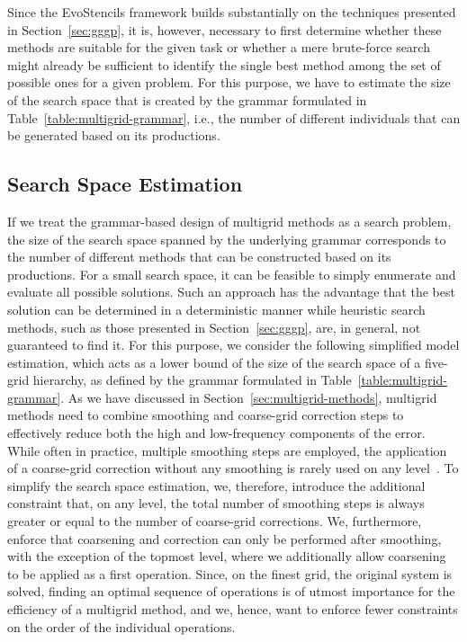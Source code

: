 Since the EvoStencils framework builds substantially on the techniques presented in Section~\ref{sec:gggp}, it is, however, necessary to first determine whether these methods are suitable for the given task or whether a mere brute-force search might already be sufficient to identify the single best method among the set of possible ones for a given problem.
For this purpose, we have to estimate the size of the search space that is created by the grammar formulated in Table~\ref{table:multigrid-grammar}, i.e., the number of different individuals that can be generated based on its productions.

\subsection{Search Space Estimation}
\label{sec:search-space-estimation}
If we treat the grammar-based design of multigrid methods as a search problem, the size of the search space spanned by the underlying grammar corresponds to the number of different methods that can be constructed based on its productions.
For a small search space, it can be feasible to simply enumerate and evaluate all possible solutions. 
Such an approach has the advantage that the best solution can be determined in a deterministic manner while heuristic search methods, such as those presented in Section~\ref{sec:gggp}, are, in general, not guaranteed to find it.
For this purpose, we consider the following simplified model estimation, which acts as a lower bound of the size of the search space of a five-grid hierarchy, as defined by the grammar formulated in Table~\ref{table:multigrid-grammar}. 
As we have discussed in Section~\ref{sec:multigrid-methods}, multigrid methods need to combine smoothing and coarse-grid correction steps to effectively reduce both the high and low-frequency components of the error.
While often in practice, multiple smoothing steps are employed, the application of a coarse-grid correction without any smoothing is rarely used on any level~\cite{trottenberg2000multigrid}.
To simplify the search space estimation, we, therefore, introduce the additional constraint that, on any level, the total number of smoothing steps is always greater or equal to the number of coarse-grid corrections.
We, furthermore, enforce that coarsening and correction can only be performed after smoothing, with the exception of the topmost level, where we additionally allow coarsening to be applied as a first operation.
Since, on the finest grid, the original system is solved, finding an optimal sequence of operations is of utmost importance for the efficiency of a multigrid method, and we, hence, want to enforce fewer constraints on the order of the individual operations.
